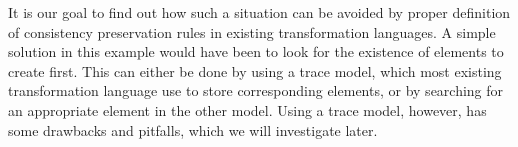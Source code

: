 It is our goal to find out how such a situation can be avoided by proper definition of consistency preservation rules in existing transformation languages.
A simple solution in this example would have been to look for the existence of elements to create first.
This can either be done by using a trace model, which most existing transformation language use to store corresponding elements, or by searching for an appropriate element in the other model.
Using a trace model, however, has some drawbacks and pitfalls, which we will investigate later.




